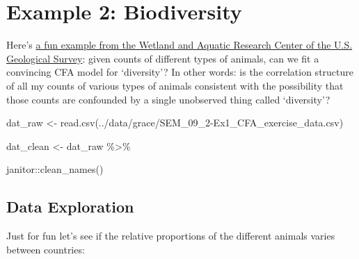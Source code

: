 \documentclass[
  letterpaper,
  DIV=11,
  numbers=noendperiod]{scrreprt}
\newenvironment{Shaded}{\begin{snugshade}}{\end{snugshade}}
\newcommand{\FunctionTok}[1]{\textcolor[rgb]{0.28,0.35,0.67}{#1}}
\newcommand{\NormalTok}[1]{\textcolor[rgb]{0.00,0.23,0.31}{#1}}
\newcommand{\OtherTok}[1]{\textcolor[rgb]{0.00,0.23,0.31}{#1}}
\newcommand{\SpecialCharTok}[1]{\textcolor[rgb]{0.37,0.37,0.37}{#1}}
\newcommand{\StringTok}[1]{\textcolor[rgb]{0.13,0.47,0.30}{#1}}
\begin{document}
\hypertarget{example-2-biodiversity}{%
\section*{Example 2: Biodiversity}\label{example-2-biodiversity}}

Here's
\href{https://d9-wret.s3.us-west-2.amazonaws.com/assets/palladium/production/s3fs-public/atoms/files/SEM_09_2-Ex1_CFA_exercise.pdf}{a
fun example from the Wetland and Aquatic Research Center of the U.S.
Geological Survey}: given counts of different types of animals, can we
fit a convincing CFA model for `diversity'? In other words: is the
correlation structure of all my counts of various types of animals
consistent with the possibility that those counts are confounded by a
single unobserved thing called `diversity'?

\begin{Shaded}
\begin{Highlighting}[]
\NormalTok{dat\_raw }\OtherTok{\textless{}{-}} \FunctionTok{read.csv}\NormalTok{(}\StringTok{\textquotesingle{}../data/grace/SEM\_09\_2{-}Ex1\_CFA\_exercise\_data.csv\textquotesingle{}}\NormalTok{)}

\NormalTok{dat\_clean }\OtherTok{\textless{}{-}}\NormalTok{ dat\_raw }\SpecialCharTok{\%\textgreater{}\%}  
  
\NormalTok{  janitor}\SpecialCharTok{::}\FunctionTok{clean\_names}\NormalTok{()}
\end{Highlighting}
\end{Shaded}

\hypertarget{data-exploration-1}{%
\subsection*{Data Exploration}\label{data-exploration-1}}

Just for fun let's see if the relative proportions of the different
animals varies between countries:
\end{document}
